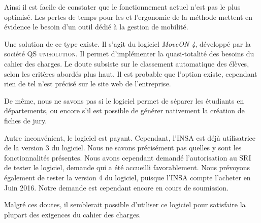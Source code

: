 \bigbreak 

Ainsi il est facile de constater que le fonctionnement actuel n'est pas le plus optimisé. Les pertes de temps pour les \ris et l'ergonomie de la méthode mettent en évidence le besoin d'un outil dédié à la gestion de mobilité. 

Une solution de ce type existe. Il s'agit du logiciel \textit{MoveON 4}, développé par la société \textsc{QS unisolution}. Il permet d'implémenter la quasi-totalité des besoins du cahier des charges. Le doute subsiste sur le classement automatique des élèves, selon les critères abordés plus haut. Il est probable que l'option existe, cependant rien de tel n'est précisé sur le site web de l'entreprise. 

De même, nous ne savons pas si le logiciel permet de séparer les étudiants en départements, ou encore s'il est possible de générer nativement la création de fiches de jury. 

Autre inconvénient, le logiciel est payant. Cependant, l'INSA est déjà utilisatrice de la version 3 du logiciel. 
Nous ne savons précisément pas quelles y sont les fonctionnalités présentes. Nous avons cependant demandé l'autorisation au SRI de tester le logiciel, demande qui a été accueilli favorablement. Nous prévoyons également de tester la version 4 du logiciel, puisque l'INSA compte l'acheter en Juin 2016. Notre demande est cependant encore en cours de soumission. 


Malgré ces doutes, il semblerait possible d'utiliser ce logiciel pour satisfaire la plupart des exigences du cahier des charges. 
